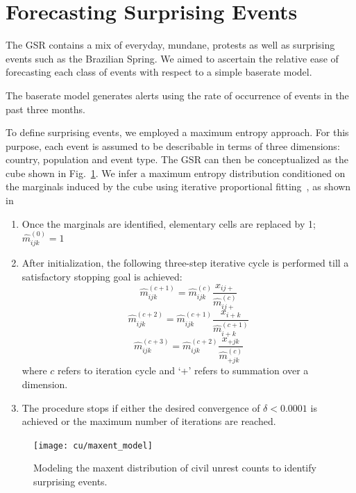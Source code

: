 \section{Forecasting Surprising Events}


The GSR contains a mix of everyday, mundane, protests as well as surprising events such as the Brazilian Spring.
We aimed to ascertain the relative ease of forecasting each class of events
with respect to a simple baserate model.

The baserate model generates alerts using the rate of occurrence of events in the past three months.

To define surprising events,
we employed a maximum entropy approach. For this purpose, each event is assumed
to be describable
in terms of three dimensions: country, population and event type. The GSR can then be conceptualized
as the cube shown in Fig.~\ref{fig:maxent_model}. We infer a maximum entropy distribution conditioned on the marginals
induced by the cube using iterative proportional fitting~\cite{bishop2007discrete}, as shown in 

\begin{enumerate}
\item Once the marginals are identified, elementary cells are replaced by 1; $\widehat{m}^{(0)}_{ijk}=1$
\item After initialization, the following three-step iterative cycle is performed till a satisfactory stopping goal is achieved:
$$\widehat{m}^{(c+1)}_{ijk} = \widehat{m}^{(c)}_{ijk}\frac{x_{ij+}}{\widehat{m}^{(c)}_{ij+}}$$
$$\widehat{m}^{(c+2)}_{ijk} = \widehat{m}^{(c+1)}_{ijk}\frac{x_{i+k}}{\widehat{m}^{(c+1)}_{i+k}}$$
$$\widehat{m}^{(c+3)}_{ijk} = \widehat{m}^{(c+2)}_{ijk}\frac{x_{+jk}}{\widehat{m}^{(c)}_{+jk}}$$
where $c$ refers to iteration cycle and `+' refers to summation over a dimension.
\item The procedure stops if either the desired convergence of $\delta < 0.0001$ is achieved or the maximum number of iterations are reached.
\end{enumerate}


\begin{figure}[H]
\centering
\texttt{[image: cu/maxent\_model]}
\caption{Modeling the maxent distribution of civil unrest counts to identify surprising events.}
\label{fig:maxent_model}
\end{figure}

